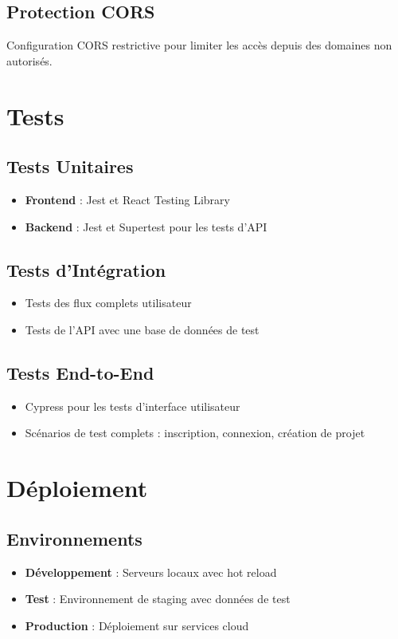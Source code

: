 \documentclass[12pt,a4paper]{article}
\begin{document}
\subsection{Protection CORS}
Configuration CORS restrictive pour limiter les accès depuis des domaines non autorisés.

\section{Tests}

\subsection{Tests Unitaires}
\begin{itemize}
    \item \textbf{Frontend} : Jest et React Testing Library
    \item \textbf{Backend} : Jest et Supertest pour les tests d'API
\end{itemize}

\subsection{Tests d'Intégration}
\begin{itemize}
    \item Tests des flux complets utilisateur
    \item Tests de l'API avec une base de données de test
\end{itemize}

\subsection{Tests End-to-End}
\begin{itemize}
    \item Cypress pour les tests d'interface utilisateur
    \item Scénarios de test complets : inscription, connexion, création de projet
\end{itemize}

\section{Déploiement}

\subsection{Environnements}
\begin{itemize}
    \item \textbf{Développement} : Serveurs locaux avec hot reload
    \item \textbf{Test} : Environnement de staging avec données de test
    \item \textbf{Production} : Déploiement sur services cloud
\end{itemize}
\end{document}
